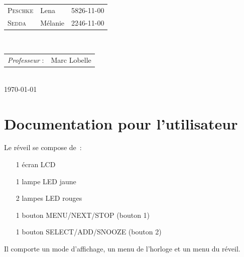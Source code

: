 \documentclass[12pt,a4paper]{article}
\begin{document}
\begin{titlepage}

\large 
{\begin{tabular}{lll}
\textsc{Peschke} & Lena & 5826-11-00\\
\textsc{Sedda} & Mélanie & 2246-11-00\\
\end{tabular}}
\\[1cm]

\normalsize
{\begin{tabular}{ll}
\textit{Professeur} : & Marc Lobelle \\
\end{tabular}}
\\[0.7cm]


{\normalsize \today}\\[3cm] %

\newpage

\end{titlepage}


\clearpage
\thispagestyle{empty}
\tableofcontents
\clearpage
{}


\section{Documentation pour l'utilisateur}

Le réveil se compose de~:
\begin{itemize}
\item[1] écran LCD
\item[1] lampe LED jaune
\item[2] lampes LED rouges
\item[1] bouton MENU/NEXT/STOP (bouton 1)
\item[1] bouton SELECT/ADD/SNOOZE (bouton 2)
\end{itemize}

Il comporte un mode d'affichage, un menu de l'horloge et un menu du réveil.
\end{document}

